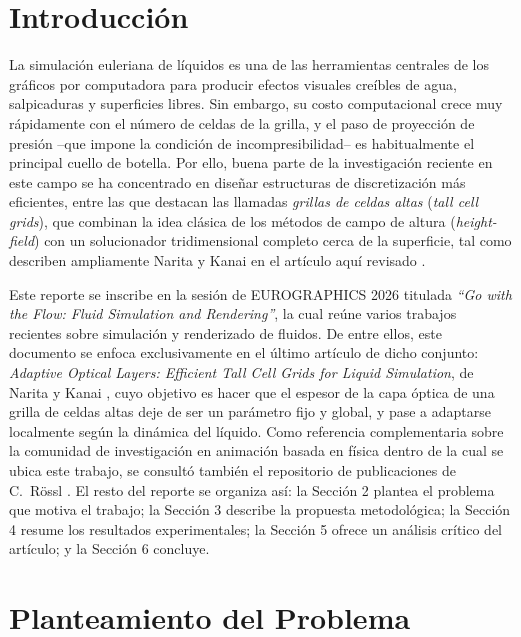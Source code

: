 \documentclass[sigconf,nonacm]{acmart}
\begin{document}
\section{Introducción}
La simulación euleriana de líquidos es una de las herramientas centrales de los gráficos por computadora para producir efectos visuales creíbles de agua, salpicaduras y superficies libres. Sin embargo, su costo computacional crece muy rápidamente con el número de celdas de la grilla, y el paso de proyección de presión --que impone la condición de incompresibilidad-- es habitualmente el principal cuello de botella. Por ello, buena parte de la investigación reciente en este campo se ha concentrado en diseñar estructuras de discretización más eficientes, entre las que destacan las llamadas \emph{grillas de celdas altas} (\emph{tall cell grids}), que combinan la idea clásica de los métodos de campo de altura (\emph{height-field}) con un solucionador tridimensional completo cerca de la superficie, tal como describen ampliamente Narita y Kanai en el artículo aquí revisado \cite{narita2026}.

Este reporte se inscribe en la sesión de EUROGRAPHICS 2026 titulada \emph{``Go with the Flow: Fluid Simulation and Rendering''}, la cual reúne varios trabajos recientes sobre simulación y renderizado de fluidos. De entre ellos, este documento se enfoca exclusivamente en el último artículo de dicho conjunto: \emph{Adaptive Optical Layers: Efficient Tall Cell Grids for Liquid Simulation}, de Narita y Kanai \cite{narita2026}, cuyo objetivo es hacer que el espesor de la capa óptica de una grilla de celdas altas deje de ser un parámetro fijo y global, y pase a adaptarse localmente según la dinámica del líquido. Como referencia complementaria sobre la comunidad de investigación en animación basada en física dentro de la cual se ubica este trabajo, se consultó también el repositorio de publicaciones de C.~Rössl \cite{roessl2026}. El resto del reporte se organiza así: la Sección 2 plantea el problema que motiva el trabajo; la Sección 3 describe la propuesta metodológica; la Sección 4 resume los resultados experimentales; la Sección 5 ofrece un análisis crítico del artículo; y la Sección 6 concluye.

\section{Planteamiento del Problema}
\end{document}
